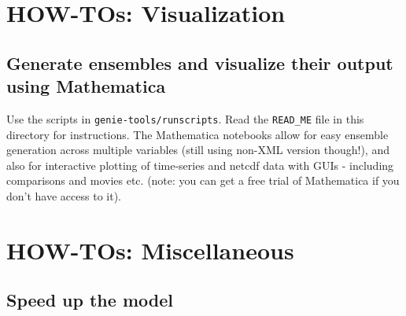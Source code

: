 \documentclass[10pt,twoside]{article}
\begin{document}

\newpage
\section{HOW-TOs: Visualization}\label{how-to-7}



\subsection{Generate ensembles and visualize their output using Mathematica}\label{Generate ensembles and visualise their output using Mathematica}

Use the scripts in \texttt{genie-tools/runscripts}. Read the \texttt{READ\_ME} file in this directory for instructions. The Mathematica notebooks allow for easy ensemble generation across multiple variables (still using non-XML version though!), and also for interactive plotting of time-series and netcdf data with GUIs - including comparisons and movies etc. (note: you can get a free trial of Mathematica if you don't have access to it).




\newpage
\section{HOW-TOs: Miscellaneous}\label{how-to-8}



\subsection{Speed up the model}\label{Speed up the model}
\end{document}
